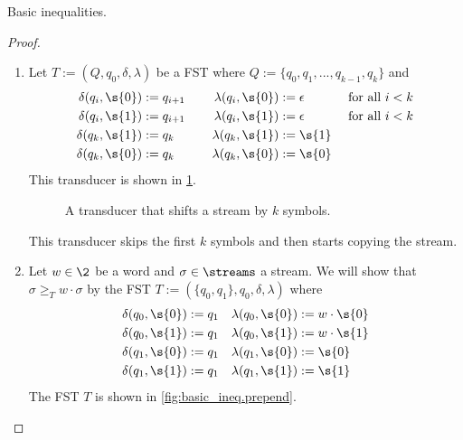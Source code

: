 \begin{proposition}{Basic inequalities.}
\begin{proof}
\begin{enumerate}
			\item Let $T := (Q,q_0,\delta,\lambda)$ be a FST where $Q := \{q_0,q_1,...,q_{k-1},q_{k}\}$ and 
			\begin{align*}
				\delta(q_i,\s{0}) &:= q_{i+1} &\lambda(q_i,\s{0}) &:= \epsilon &\text{ for all } i<k\\
				\delta(q_i,\s{1}) &:= q_{i+1} &\lambda(q_i,\s{1}) &:= \epsilon &\text{ for all } i<k\\
				\delta(q_k,\s{1}) &:= q_k \qquad&\lambda(q_k,\s{1}) &:= \s{1}\\
				\delta(q_k,\s{0}) &:= q_k \qquad&\lambda(q_k,\s{0}) &:= \s{0}
			\end{align*}
			This transducer is shown in \cref{fig:basic_ineq.shift}.
			\begin{figure}[H]
				\centering
				\caption{A transducer that shifts a stream by $k$ symbols.}
				\label{fig:basic_ineq.shift}
			\end{figure}
			This transducer skips the first $k$ symbols and then starts copying the stream. 
			\item Let $w\in\2$ be a word and $\sigma\in\streams$ a stream. We will show that $\sigma \geq_{T} w\cdot\sigma$ by the FST $T := (\{q_0,q_1\},q_0,\delta,\lambda)$ where
			\begin{align*}
				\delta(q_0, \s{0}) &:= q_1 & \lambda(q_0, \s{0}) &:= w \cdot \s{0} \\
				\delta(q_0, \s{1}) &:= q_1 & \lambda(q_0, \s{1}) &:= w \cdot \s{1} \\
				\delta(q_1, \s{0}) &:= q_1 & \lambda(q_1, \s{0}) &:= \s{0} \\
				\delta(q_1, \s{1}) &:= q_1 & \lambda(q_1, \s{1}) &:= \s{1}
			\end{align*}
			The FST $T$ is shown in \cref{fig:basic_ineq.prepend}.
			\begin{figure}[H]

\end{figure}
\end{enumerate}
\end{proof}
\end{proposition}
